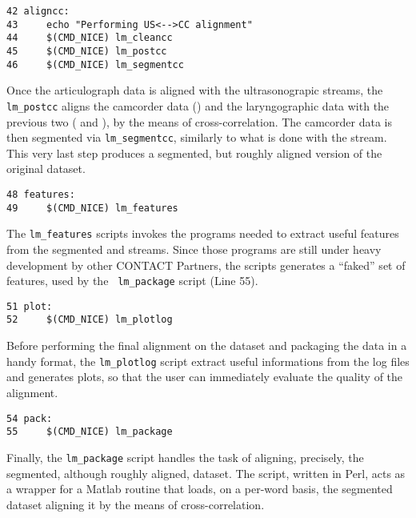 \begin{scriptsize}
\begin{verbatim}
42 aligncc:
43     echo "Performing US<-->CC alignment"
44     $(CMD_NICE) lm_cleancc
45     $(CMD_NICE) lm_postcc
46     $(CMD_NICE) lm_segmentcc
\end{verbatim}
\end{scriptsize}
Once the articulograph data is aligned with the ultrasonograpic streams, the
{\tt lm\_postcc} aligns the camcorder data () and the laryngographic
data with the previous two ( and ), by the means of 
cross-correlation.
The camcorder data is then segmented via {\tt lm\_segmentcc}, similarly to what
is done with the  stream.
This very last step produces a segmented, but roughly aligned version of the
original dataset.

\begin{scriptsize}
\begin{verbatim}
48 features:
49     $(CMD_NICE) lm_features
\end{verbatim}
\end{scriptsize}
The {\tt lm\_features} scripts invokes the programs needed to extract useful
features from the segmented  and  streams.
Since those programs are still under heavy development by other CONTACT
Partners, the scripts generates a ``faked'' set of features, used by the {\tt
lm\_package} script (Line 55).

\begin{scriptsize}
\begin{verbatim}
51 plot:
52     $(CMD_NICE) lm_plotlog
\end{verbatim}
\end{scriptsize}
Before performing the final alignment on the dataset and packaging the data in
a handy format, the {\tt lm\_plotlog} script extract useful informations from
the log files and generates plots, so that the user can immediately evaluate the
quality of the alignment.

\begin{scriptsize}
\begin{verbatim}
54 pack:
55     $(CMD_NICE) lm_package
\end{verbatim}
\end{scriptsize}
Finally, the {\tt lm\_package} script handles the task of aligning, precisely,
the segmented, although roughly aligned, dataset.
The script, written in Perl, acts as a wrapper for a Matlab routine that loads,
on a per-word basis, the segmented dataset aligning it by the means of
cross-correlation.

